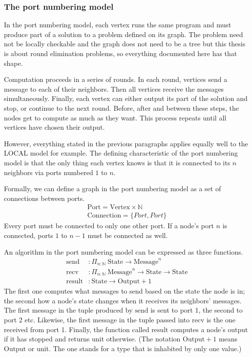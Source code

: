 \documentclass[english, 12pt, a4paper, sci, a-1b, online]{aaltothesis}
\begin{document}
\subsubsection{The port numbering model}

In the port numbering model, each vertex runs the same program and must produce part of a solution to a problem defined on its graph. The problem need not be locally checkable and the graph does not need to be a tree but this thesis is about round elimination problems, so everything documented here has that shape.

Computation proceeds in a series of rounds. In each round, vertices send a message to each of their neighbors. Then all vertices receive the messages simultaneously. Finally, each vertex can either output its part of the solution and stop, or continue to the next round. Before, after and between these steps, the nodes get to compute as much as they want. This process repeats until all vertices have chosen their output.

However, everything stated in the previous paragraphs applies equally well to the LOCAL model for example. The defining characteristic of the port numbering model is that the only thing each vertex knows is that it is connected to its $n$ neighbors via ports numbered $1$ to $n$.

Formally, we can define a graph in the port numbering model as a set of connections between ports.
\begin{align*}
  \text{Port} = \text{Vertex} \times \mathbb{N} \\
  \text{Connection} = \{Port, Port\}
\end{align*}
Every port must be connected to only one other port. If a node's port $n$ is connected, ports $1$ to $n-1$ must be connected as well.

An algorithm in the port numbering model can be expressed as three functions.
\begin{align*}
  \text{send} &: \Pi_{n : \mathbb{N}}~\text{State} \to \text{Message}^n \\
  \text{recv} &: \Pi_{n : \mathbb{N}}~\text{Message}^n \to \text{State} \to \text{State} \\
  \text{result} &: \text{State} \to \text{Output} + 1
\end{align*}
The first one computes what messages to send based on the state the node is in; the second how a node's state changes when it receives its neighbors' messages. The first message in the tuple produced by $\text{send}$ is sent to port 1, the second to port 2 etc. Likewise, the first message in the tuple passed into $\text{recv}$ is the one received from port 1. Finally, the function called $\text{result}$ computes a node's output if it has stopped and returns unit otherwise. (The notation $\text{Output} + 1$ means $\text{Output}$ or unit. The one stands for a type that is inhabited by only one value.)
\end{document}
